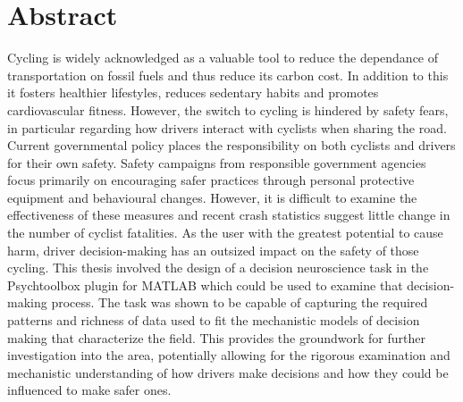 \chapter{Abstract}
Cycling is widely acknowledged as a valuable tool to reduce the dependance of transportation on fossil fuels and thus reduce its carbon cost. In addition to this it fosters healthier lifestyles, reduces sedentary habits and promotes cardiovascular fitness. However, the switch to cycling is hindered by safety fears, in particular regarding how drivers interact with cyclists when sharing the road. Current governmental policy places the responsibility on both cyclists and drivers for their own safety. Safety campaigns from responsible government agencies focus primarily on encouraging safer practices through personal protective equipment and behavioural changes. However, it is difficult to examine the effectiveness of these measures and recent crash statistics suggest little change in the number of cyclist fatalities. As the user with the greatest potential to cause harm, driver decision-making has an outsized impact on the safety of those cycling. This thesis involved the design of a decision neuroscience task in the Psychtoolbox plugin for MATLAB which could be used to examine that decision-making process. The task was shown to be capable of capturing the required patterns and richness of data used to fit the mechanistic models of decision making that characterize the field. This provides the groundwork for further investigation into the area, potentially allowing for the rigorous examination and mechanistic understanding of how drivers make decisions and how they could be influenced to make safer ones.